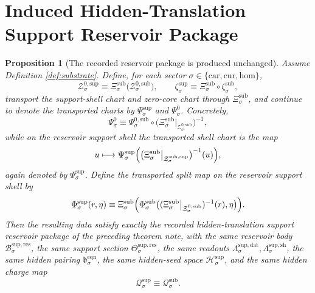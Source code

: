 \documentclass[11pt]{article}
\newcommand{\Car}{\mathrm{car}}
\newcommand{\Cur}{\mathrm{cur}}
\newcommand{\Hom}{\mathrm{hom}}
\newcommand{\EqnPair}[1]{\mathfrak b_{#1}^{\mathrm{eqn}}}
\newcommand{\ResBody}[1]{\mathcal B_{#1}^{\mathrm{sup,res}}}
\newcommand{\ResSection}[1]{\Theta_{#1}^{\mathrm{sup,res}}}
\newcommand{\ResData}[1]{\Lambda_{#1}^{\mathrm{sup,dat}}}
\newcommand{\ResShellMap}[1]{\Lambda_{#1}^{\mathrm{sup,sh}}}
\newcommand{\ResZeroCore}[1]{\mathcal Z_{#1}^{0,\mathrm{sup}}}
\newcommand{\SeedHidden}[1]{\mathcal H_{#1}^{\mathrm{sup}}}
\newcommand{\ShellChart}[1]{\Psi_{#1}^{\mathrm{sup}}}
\newcommand{\ZeroChart}[1]{\Psi_{#1}^{0}}
\newcommand{\SplitMap}[1]{\Phi_{#1}^{\mathrm{sup}}}
\newcommand{\HiddenCharge}[1]{\mathcal Q_{#1}^{\mathrm{sup}}}
\newcommand{\ResEmbed}[1]{\zeta_{#1}^{\mathrm{sup}}}
\newcommand{\SubChart}[1]{\Xi_{#1}^{\mathrm{sub}}}
\newcommand{\SubSupportShell}[1]{\mathcal Z_{#1}^{\mathrm{sub,sup}}}
\newcommand{\SubZeroCore}[1]{\mathcal Z_{#1}^{0,\mathrm{sub}}}
\newcommand{\SubZeroChart}[1]{\Psi_{#1}^{0,\mathrm{sub}}}
\newcommand{\SubSplit}[1]{\Phi_{#1}^{\mathrm{sub}}}
\newcommand{\SubCharge}[1]{\mathcal Q_{#1}^{\mathrm{sub}}}
\newcommand{\SubEmbed}[1]{\zeta_{#1}^{\mathrm{sub}}}
\newtheorem{proposition}{Proposition}
\begin{document}
\section{Induced Hidden-Translation Support Reservoir Package}

\begin{proposition}[The recorded reservoir package is produced unchanged]
\label{prop:reservoir}
Assume Definition \ref{def:substrate}. Define, for each sector \(\sigma\in\{\Car,\Cur,\Hom\}\),
\begin{equation}
\ResZeroCore{\sigma}
\equiv
\SubChart{\sigma}\bigl(\SubZeroCore{\sigma}\bigr),
\qquad
\ResEmbed{\sigma}
\equiv
\SubChart{\sigma}\circ\SubEmbed{\sigma},
\label{eq:inducedreszero}
\end{equation}
transport the support-shell chart and zero-core chart through \(\SubChart{\sigma}\), and continue to denote the transported charts by \(\ShellChart{\sigma}\) and \(\ZeroChart{\sigma}\). Concretely,
\begin{equation}
\ZeroChart{\sigma}
\equiv
\SubZeroChart{\sigma}\circ
\bigl(\SubChart{\sigma}\big|_{\SubZeroCore{\sigma}}\bigr)^{-1},
\label{eq:transportedzerochart}
\end{equation}
while on the reservoir support shell the transported shell chart is the map
\[
u\longmapsto
\ShellChart{\sigma}\Bigl(
\bigl(\SubChart{\sigma}\big|_{\SubSupportShell{\sigma}}\bigr)^{-1}(u)
\Bigr),
\]
again denoted by \(\ShellChart{\sigma}\).
Define the transported split map on the reservoir support shell by
\begin{equation}
\SplitMap{\sigma}(r,\eta)
\equiv
\SubChart{\sigma}\Bigl(
\SubSplit{\sigma}\bigl(
(\SubChart{\sigma}\big|_{\SubZeroCore{\sigma}})^{-1}(r),
\eta
\bigr)
\Bigr).
\label{eq:transportedsplit}
\end{equation}
Then the resulting data satisfy exactly the recorded hidden-translation support reservoir package of the preceding theorem note, with the same reservoir body \(\ResBody{\sigma}\), the same support section \(\ResSection{\sigma}\), the same readouts \(\ResData{\sigma},\ResShellMap{\sigma}\), the same hidden pairing \(\EqnPair{\sigma}\), the same hidden-seed space \(\SeedHidden{\sigma}\), and the same hidden charge map
\[
\HiddenCharge{\sigma}\equiv\SubCharge{\sigma}.
\]
\end{proposition}
\end{document}
